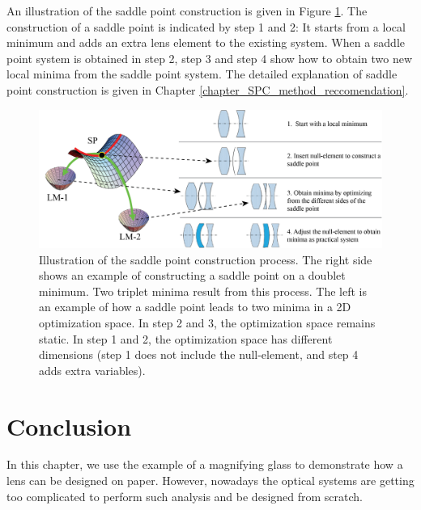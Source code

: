 An illustration of the saddle point construction is given in Figure \ref{fig: spc_illustration}. The construction of a saddle point is indicated by step 1 and 2: It starts from a local minimum and adds an extra lens element to the existing system. When a saddle point system is obtained in step 2, step 3 and step 4 show how to obtain two new local minima from the saddle point system. The detailed explanation of saddle point construction is given in Chapter \ref{chapter_SPC_method_reccomendation}. 

\begin{figure}
    \centering
    \includegraphics[scale=0.58]{chapter-1/figures/spc_illustrate.png}
    \caption{Illustration of the saddle point construction process. The right side shows an example of constructing a saddle point on a doublet minimum. Two triplet minima result from this process. The left is an example of how a saddle point leads to two minima in a 2D optimization space. In step 2 and 3, the optimization space remains static. In step 1 and 2, the optimization space has different dimensions (step 1 does not include the null-element, and step 4 adds extra variables). }
    \label{fig: spc_illustration}
\end{figure} 



\section{Conclusion}
In this chapter, we use the example of a magnifying glass to demonstrate how a lens can be designed on paper. However, nowadays the optical systems are getting too complicated to perform such analysis and be designed from scratch. 

